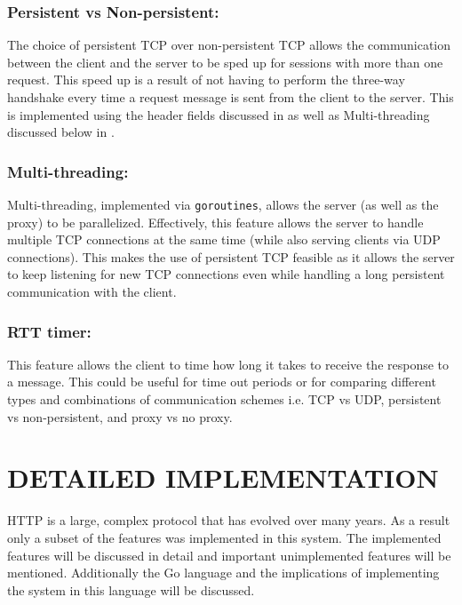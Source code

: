 \documentclass[10pt,twocolumn]{witseiepaper}
\begin{document}
	\subsubsection{Persistent vs Non-persistent:}

	The choice of persistent TCP over non-persistent TCP allows the communication between the client and the server to be sped up for sessions with more than one request. This speed up is a result of not having to perform the three-way handshake every time a request message is sent from the client to the server. This is implemented using the header fields discussed in  as well as Multi-threading discussed below in .

	\subsubsection{Multi-threading:} \label{thread}

	Multi-threading, implemented via \texttt{goroutines}, allows the server (as well as the proxy) to be parallelized. Effectively, this feature allows the server to handle multiple TCP connections at the same time (while also serving clients via UDP connections). This makes the use of persistent TCP feasible as it allows the server to keep listening for new TCP connections even while handling a long persistent communication with the client.

	\subsubsection{RTT timer:}

	This feature allows the client to time how long it takes to receive the response to a message. This could be useful for time out periods or for comparing different types and combinations of communication schemes i.e. TCP vs UDP, persistent vs non-persistent, and proxy vs no proxy.

\section{DETAILED IMPLEMENTATION}

HTTP is a large, complex protocol that has evolved over many years. As a result only a subset of the features was implemented in this system. The implemented features will be discussed in detail and important unimplemented features will be mentioned. Additionally the Go language and the implications of implementing the system in this language will be discussed.
\end{document}
